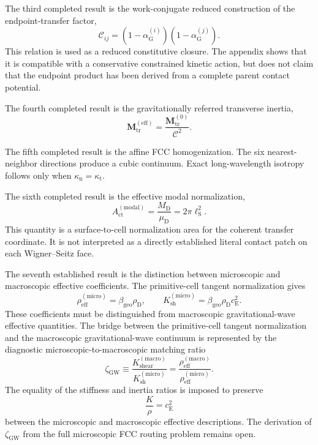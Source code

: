 The third completed result is the work-conjugate reduced construction of the endpoint-transfer factor,
\begin{equation}
    \mathcal{C}_{ij} = (1-\alpha_{\mathrm{G}}^{(i)}) (1-\alpha_{\mathrm{G}}^{(j)}).
\end{equation}
This relation is used as a reduced constitutive closure. The appendix shows that it is compatible with a conservative constrained kinetic action, but does not claim that the endpoint product has been derived from a complete parent contact potential.

The fourth completed result is the gravitationally referred transverse inertia,
\begin{equation}
    \mathbf{M}_{\mathrm{tr}}^{(\mathrm{eff})} = \frac{\mathbf{M}_{\mathrm{tr}}^{(0)}}{\mathcal{C}^2}.
\end{equation}

The fifth completed result is the affine FCC homogenization. The six nearest-neighbor directions produce a cubic continuum. Exact long-wavelength isotropy follows only when $\kappa_{\mathrm{n}} = \kappa_{\mathrm{t}}$.

The sixth completed result is the effective modal normalization,
\begin{equation}
    A_{\mathrm{ct}}^{(\mathrm{modal})} = \frac{M_{\mathrm{D}}}{\mu_{\mathrm{D}}} = 2\pi\ell_{\mathrm{S}}^2.
\end{equation}
This quantity is a surface-to-cell normalization area for the coherent transfer coordinate. It is not interpreted as a directly established literal contact patch on each Wigner–Seitz face.

The seventh established result is the distinction between microscopic and macroscopic effective coefficients. The primitive-cell tangent normalization gives
\begin{equation}
    \rho_{\mathrm{eff}}^{(\mathrm{micro})} = \beta_{\mathrm{geo}}\rho_{\mathrm{D}}, \qquad K_{\mathrm{sh}}^{(\mathrm{micro})} = \beta_{\mathrm{geo}}\rho_{\mathrm{D}}c_{\mathrm{E}}^2.
\end{equation}
These coefficients must be distinguished from macroscopic gravitational-wave effective quantities. The bridge between the primitive-cell tangent normalization and the macroscopic gravitational-wave continuum is represented by the diagnostic microscopic-to-macroscopic matching ratio
\begin{equation}
    \zeta_{\mathrm{GW}} \equiv \frac{ K_{\mathrm{shear}}^{(\mathrm{macro})} }{ K_{\mathrm{sh}}^{(\mathrm{micro})} } = \frac{ \rho_{\mathrm{eff}}^{(\mathrm{macro})} }{ \rho_{\mathrm{eff}}^{(\mathrm{micro})} }.
\end{equation}
The equality of the stiffness and inertia ratios is imposed to preserve
\begin{equation}
    \frac{K}{\rho} = c_{\mathrm{E}}^2
\end{equation}
between the microscopic and macroscopic effective descriptions. The derivation of $\zeta_{\mathrm{GW}}$ from the full microscopic FCC routing problem remains open.

